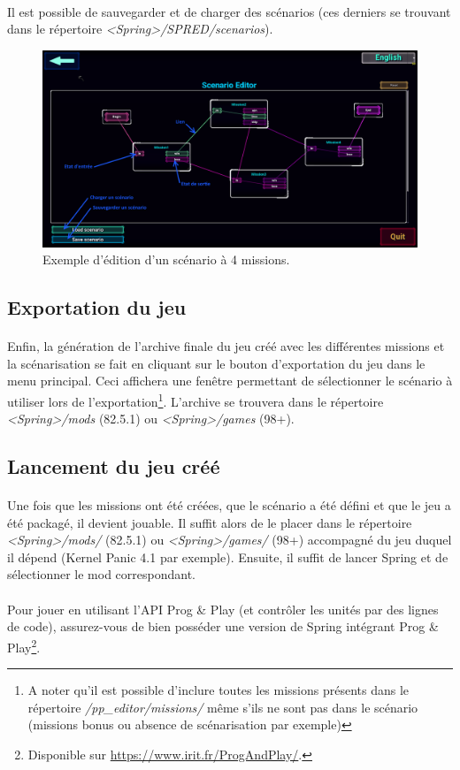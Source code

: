 \documentclass[a4paper]{article}
\begin{document}
\paragraph{ }
Il est possible de sauvegarder et de charger des scénarios (ces derniers se trouvant dans le répertoire \textit{<Spring>/SPRED/scenarios}).
\begin{figure}[H]
\centering
\includegraphics[width=\linewidth]{launcher-scenario.png}
\caption{Exemple d'édition d'un scénario à 4 missions.}
\label{fig:launcher-scenario}
\end{figure}
\subsection{Exportation du jeu}\label{export-game}
\paragraph{ }
Enfin, la génération de l'archive finale du jeu créé avec les différentes missions et la scénarisation se fait en cliquant sur le bouton d'exportation du jeu dans le menu principal. Ceci affichera une fenêtre permettant de sélectionner le scénario à utiliser lors de l'exportation\footnote{A noter qu'il est possible d'inclure toutes les missions présents dans le répertoire \textit{/pp\_editor/missions/} même s'ils ne sont pas dans le scénario (missions bonus ou absence de scénarisation par exemple)}. L'archive se trouvera dans le répertoire \textit{<Spring>/mods} (82.5.1) ou \textit{<Spring>/games} (98+).
\subsection{Lancement du jeu créé}
\paragraph{ }
Une fois que les missions ont été créées, que le scénario a été défini et que le jeu a été packagé, il devient jouable. Il suffit alors de le placer dans le répertoire \textit{<Spring>/mods/} (82.5.1) ou \textit{<Spring>/games/} (98+) accompagné du jeu duquel il dépend (Kernel Panic 4.1 par exemple). Ensuite, il suffit de lancer Spring et de sélectionner le mod correspondant.
\paragraph{ }
Pour jouer en utilisant l'API Prog \& Play (et contrôler les unités par des lignes de code), assurez-vous de bien posséder une version de Spring intégrant Prog \& Play\footnote{Disponible sur \url{https://www.irit.fr/ProgAndPlay/}.}.
\end{document}
